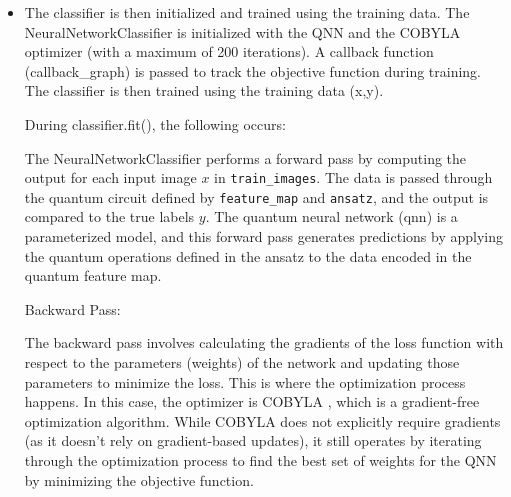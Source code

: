 \documentclass[conference]{IEEEtran}
\begin{document}
\begin{itemize}
    {\small
    \begin{verbatim}
circuit = QuantumCircuit(8)
circuit.compose(feature_map
, range(8), inplace=True)
circuit.compose(ansatz
, range(8), inplace=True)

observable = 
SparsePauliOp.from_list([("Z" + "I" * 7, 1)])

qnn = EstimatorQNN(
    circuit=circuit.decompose(),
    observables=observable,
    input_params=feature_map.parameters,
    weight_params=ansatz.parameters,
    estimator=estimator,
)
    \end{verbatim}}


    \item The classifier is then initialized and trained using the training data. The NeuralNetworkClassifier is initialized with the QNN and the COBYLA optimizer (with a maximum of 200 iterations). A callback function (callback\_graph) is passed to track the objective function during training. The classifier is then trained using the training data (x,y).
    

    During classifier.fit(), the following occurs:

    The NeuralNetworkClassifier performs a forward pass by computing the output for each input image \( x \) in \texttt{train\_images}. The data is passed through the quantum circuit defined by \texttt{feature\_map} and \texttt{ansatz}, and the output is compared to the true labels \( y \).
    The quantum neural network (qnn) is a parameterized model, and this forward pass generates predictions by applying the quantum operations defined in the ansatz to the data encoded in the quantum feature map.

    Backward Pass:

    The backward pass involves calculating the gradients of the loss function with respect to the parameters (weights) of the network and updating those parameters to minimize the loss. This is where the optimization process happens.
    In this case, the optimizer is COBYLA \cite{qiskit_cobyla}, which is a gradient-free optimization algorithm. While COBYLA does not explicitly require gradients (as it doesn't rely on gradient-based updates), it still operates by iterating through the optimization process to find the best set of weights for the QNN by minimizing the objective function.


\end{itemize}
\end{document}
